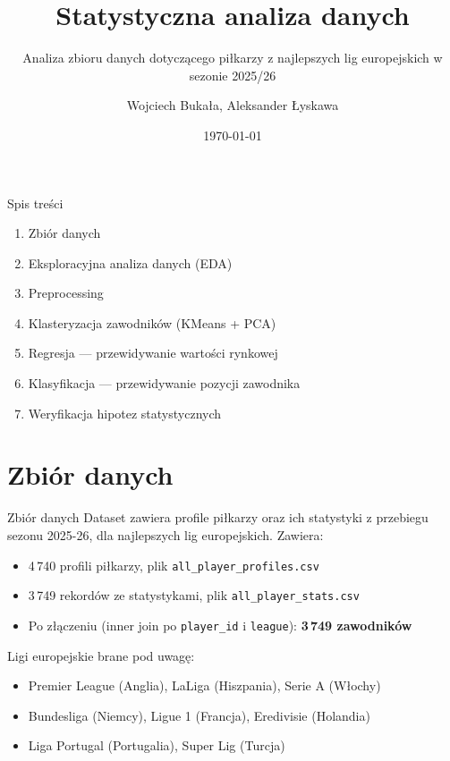 \documentclass[aspectratio=169]{beamer}
\author{Wojciech Bukała, Aleksander Łyskawa}
\title{Statystyczna analiza danych}
\subtitle{Analiza zbioru danych dotyczącego piłkarzy z najlepszych lig europejskich w sezonie 2025/26}
\institute{Politechnika Wrocławska}
\date{\today}
\begin{document}
\begin{frame}
    \maketitle
\end{frame}

\begin{frame}{Spis treści}
    \begin{enumerate}
        \item Zbiór danych
        \item Eksploracyjna analiza danych (EDA)
        \item Preprocessing
        \item Klasteryzacja zawodników (KMeans + PCA)
        \item Regresja — przewidywanie wartości rynkowej
        \item Klasyfikacja — przewidywanie pozycji zawodnika
        \item Weryfikacja hipotez statystycznych
    \end{enumerate}
\end{frame}


\section{Zbiór danych}

\begin{frame}{Zbiór danych}
    Dataset zawiera profile piłkarzy oraz ich statystyki z przebiegu sezonu 2025-26, dla najlepszych lig europejskich. Zawiera:
    \begin{itemize}
        \item 4\,740 profili piłkarzy, plik \texttt{all\_player\_profiles.csv}
        \item 3\,749 rekordów ze statystykami, plik \texttt{all\_player\_stats.csv}
        \item Po złączeniu (inner join po \texttt{player\_id} i \texttt{league}): \textbf{3\,749 zawodników}
    \end{itemize}

    \vspace{0.3cm}

    Ligi europejskie brane pod uwagę:
    \begin{itemize}
        \item Premier League (Anglia), LaLiga (Hiszpania), Serie A (Włochy)
        \item Bundesliga (Niemcy), Ligue 1 (Francja), Eredivisie (Holandia)
        \item Liga Portugal (Portugalia), Super Lig (Turcja)
    \end{itemize}

\end{frame}
\end{document}
